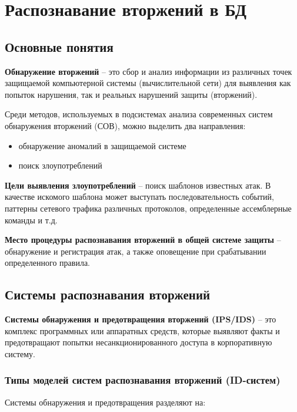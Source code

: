 \section{Распознавание вторжений в БД}
\subsection{Основные понятия}

\textbf{Обнаружение вторжений} -- это сбор и анализ информации из различных точек защищаемой компьютерной системы (вычислительной сети) для выявления как попыток нарушения, так и реальных нарушений защиты (вторжений).


Среди методов, используемых в подсистемах анализа современных систем обнаружения вторжений (СОВ), можно выделить два направления:
\begin{itemize}
	\item обнаружение аномалий в защищаемой системе
	\item поиск злоупотреблений
\end{itemize}

\textbf{Цели выявления злоупотреблений} -- поиск шаблонов известных атак. В качестве искомого шаблона может выступать последовательность событий, паттерны сетевого трафика различных протоколов, определенные ассемблерные команды и т.д.

\textbf{Место процедуры распознавания вторжений в общей системе защиты} -- обнаружение и регистрация атак, а также оповещение при срабатывании определенного правила.

\subsection{Системы распознавания вторжений}

\textbf{Системы обнаружения и предотвращения вторжений (IPS/IDS)} -- это комплекс программных или аппаратных средств, которые выявляют факты и предотвращают попытки несанкционированного доступа в корпоративную систему.

\subsubsection*{Типы моделей систем распознавания вторжений (ID-систем)}

Системы обнаружения и предотвращения разделяют на:

